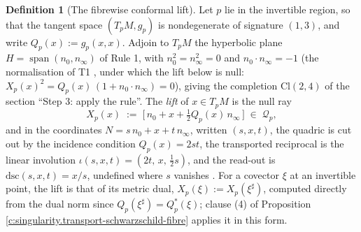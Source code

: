\documentclass[11pt]{article}
\theoremstyle{definition}
\newtheorem{definition}[theorem]{Definition}
\theoremstyle{plain}
\providecommand{\Cl}{}\renewcommand{\Cl}{\mathrm{Cl}}
\providecommand{\dsc}{}\renewcommand{\dsc}{\mathrm{dsc}}
\providecommand{\nInf}{}\renewcommand{\nInf}{n_\infty}
\providecommand{\nO}{}\renewcommand{\nO}{n_0}
\begin{document}
\begin{definition}[The fibrewise conformal lift]\label{c:obj.singularity.fibrewise-conformal-lift}
Let $p$ lie in the invertible region, so that the tangent space $(T_pM, g_p)$ is nondegenerate of signature $(1,3)$, and write $Q_p(x) := g_p(x,x)$.
Adjoin to $T_pM$ the hyperbolic plane $H = \operatorname{span}(\nO, \nInf)$ of Rule 1, with $\nO^2 = \nInf^2 = 0$ and $\nO \cdot \nInf = -1$ (the normalisation of T1 \cite{ButlerT1}, under which the lift below is null: $X_p(x)^{2} = Q_p(x)\,(1 + \nO\cdot\nInf) = 0$), giving the completion $\Cl(2,4)$ of the section ``Step 3: apply the rule''. The \emph{lift} of $x \in T_pM$ is the null ray
\begin{equation}
X_p(x) \;:=\; \bigl[\, \nO + x + \tfrac12 Q_p(x)\, \nInf \,\bigr] \;\in\; \mathcal{Q}_p ,
\end{equation}
and in the coordinates $N = s\,\nO + x + t\,\nInf$, written $(s,x,t)$, the quadric is cut out by the incidence condition $Q_p(x) = 2st$, the transported reciprocal is the linear involution $\iota(s,x,t) = (2t,\, x,\, \tfrac12 s)$, and the read-out is $\dsc(s,x,t) = x/s$, undefined where $s$ vanishes \cite[Thm.~4.10, Prop.~4.21, Lem.~4.23]{ButlerT1}. For a covector $\xi$ at an invertible point, the lift is that of its metric dual, $X_p(\xi) := X_p(\xi^{\sharp})$, computed directly from the dual norm since $Q_p(\xi^{\sharp}) = Q^{*}_p(\xi)$; clause (4) of Proposition \ref{c:singularity.transport-schwarzschild-fibre} applies it in this form.
\end{definition}
\end{document}
